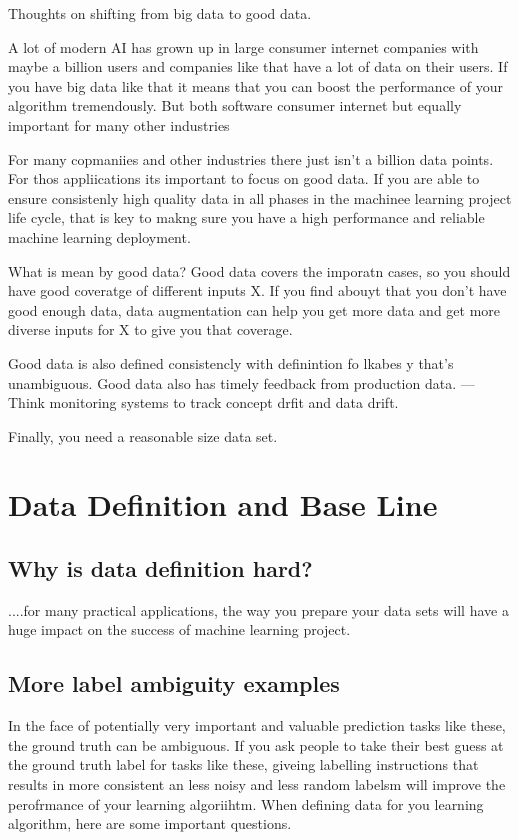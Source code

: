 Thoughts on shifting from big data to good data.

A lot of modern AI has grown up in large consumer internet companies with maybe a billion users and companies like that have a lot of data on their users.
If you have big data like that it means that you can boost the performance of your algorithm tremendously.
But both software consumer internet but equally important for many other industries

For many copmaniies and other industries there just isn't a billion data points.
For thos appliications its important to focus on good data.
If you are able to ensure consistenly high quality data in all phases in the machinee learning project life cycle, that is key to makng sure you have a high performance and reliable machine learning deployment.


What is mean by good data?
Good data covers the imporatn cases, so you should have good coveratge of different inputs X.
If you find abouyt that you don't have good enough data, data augmentation can help you get more data and get more diverse inputs for X to give you that coverage.

Good data is also defined consistencly with definintion fo lkabes y that's unambiguous.
Good data also has timely feedback from production data.
--- Think monitoring systems to track concept drfit and data drift.

Finally, you need a reasonable size data set.

\chapter{Data Definition and Base Line}

\section{Why is data definition hard?}

....for many practical applications, the way you prepare your data sets will have a huge impact on the success of machine learning project.

\section{More label ambiguity examples}

In the face of potentially very important and valuable prediction tasks like these, the ground truth can be ambiguous.
If you ask people to take their best guess at the ground truth label for tasks like these, giveing labelling instructions that results in more consistent an less noisy and less random labelsm will improve the perofrmance of your learning algoriihtm.
When defining data for you learning algorithm, here are some important questions.

